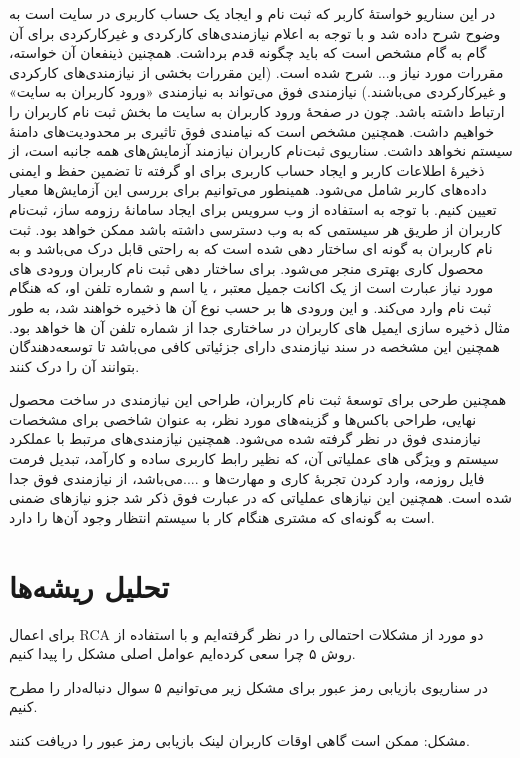 \documentclass[]{article}
\begin{document}
	در این سناریو خواستۀ کاربر که ثبت نام و ایجاد یک حساب کاربری در سایت است به وضوح شرح داده شد و با توجه به اعلام نیازمندی‌های کارکردی و غیرکارکردی برای آن گام به گام مشخص است که باید چگونه قدم برداشت. همچنین ذینفعان آن خواسته، مقررات مورد نیاز و... شرح شده است. (این مقررات بخشی از نیازمندی‌های کارکردی و غیرکارکردی می‌باشند.) 
	نیازمندی فوق می‌تواند به نیازمندی‌ «ورود کاربران به سایت» ارتباط داشته باشد. چون در صفحۀ ورود کاربران به سایت ما بخش ثبت نام کاربران را خواهیم داشت. همچنین مشخص است که نیامندی فوق تاثیری بر محدودیت‌های دامنۀ سیستم نخواهد داشت. 
	سناریوی ثبت‌نام کاربران نیازمند آزمایش‌های همه جانبه است، از ذخیرۀ اطلاعات کاربر و ایجاد حساب کاربری برای او گرفته تا تضمین حفظ و ایمنی داده‌های کاربر شامل می‌شود. همینطور می‌توانیم برای بررسی این آزمایش‌ها معیار تعیین کنیم.
	با توجه به استفاده از وب سرویس برای ایجاد سامانۀ رزومه ساز، ثبت‌نام کاربران از طریق هر 
	سیستمی که به وب دسترسی داشته باشد ممکن خواهد بود.
	ثبت نام کاربران به گونه ای ساختار دهی شده است که به راحتی قابل درک می‌باشد و به محصول کاری بهتری منجر می‌شود‌.
	برای ساختار دهی ثبت نام کاربران ورودی های مورد نیاز عبارت است از یک اکانت جمیل معتبر ، یا اسم و شماره تلفن او، که هنگام ثبت نام وارد می‌کند.
	و این ورودی ها بر حسب نوع آن ها  ذخیره خواهند شد، به طور مثال ذخیره سازی ایمیل های کاربران در ساختاری جدا از شماره تلفن آن ها خواهد بود.
	همچنین این مشخصه در سند نیازمندی دارای جزئیاتی کافی می‌باشد تا توسعه‌دهندگان بتوانند آن را درک کنند.
	
	همچنین طرحی برای توسعۀ ثبت نام کاربران، طراحی این نیازمندی در ساخت محصول نهایی، طراحی باکس‌ها و گزینه‌های  مورد نظر،  به عنوان شاخصی برای مشخصات نیازمندی فوق در نظر گرفته شده می‌شود.
	همچنین نیازمندی‌های مرتبط با عملکرد سیستم و ویژگی های عملیاتی آن، که نظیر 
	رابط کاربری ساده و کارآمد، تبدیل فرمت فایل روزمه، وارد کردن تجربۀ کاری و مهارت‌ها و ....می‌باشد، از نیازمندی فوق جدا شده است. 
	همچنین این نیازهای عملیاتی که در عبارت فوق ذکر شد جزو نیازهای ضمنی است به گونه‌ای که مشتری هنگام کار با سیستم انتظار وجود آن‌ها را دارد.
	
	
	\section{\huge{تحلیل ریشه‌ها}}
	برای اعمال RCA دو مورد از مشکلات احتمالی را در نظر گرفته‌ایم و با استفاده از روش ۵ چرا سعی کرده‌ایم عوامل اصلی مشکل را پیدا کنیم.
	
	در سناریوی بازیابی رمز عبور برای مشکل زیر می‌توانیم ۵ سوال دنباله‌دار را مطرح کنیم.
	
	مشکل: ممکن است گاهی اوقات کاربران لینک بازیابی رمز عبور را دریافت کنند.
	
\end{document}

